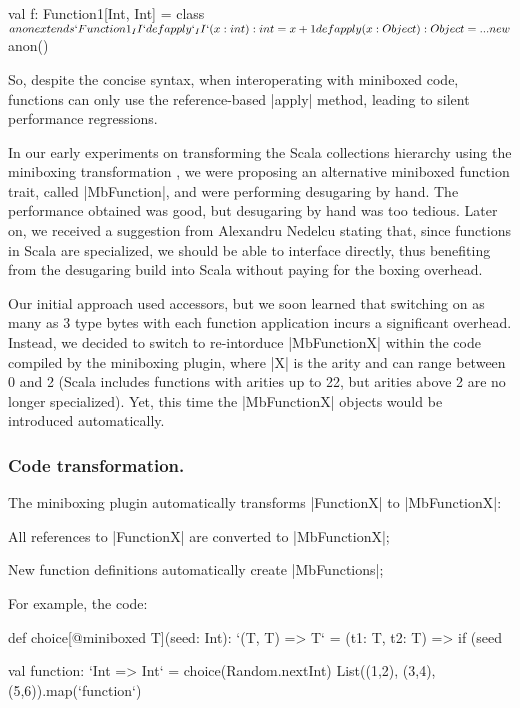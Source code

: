 \begin{lstlisting-nobreak}
 val f: Function1[Int, Int] = {
   class $anon extends `Function1_II` {
     def apply`_II`(x: int): int = x + 1
     def apply(x: Object): Object = ...
   }
   new $anon()
 }
\end{lstlisting-nobreak}

So, despite the concise syntax, when interoperating with miniboxed code, functions can only use the reference-based |apply| method, leading to silent performance regressions.

In our early experiments on transforming the Scala collections hierarchy using the miniboxing transformation \cite{miniboxing-linkedlist}, we were proposing an alternative miniboxed function trait, called |MbFunction|, and were performing desugaring by hand. The performance obtained was good, but desugaring by hand was too tedious. Later on, we received a suggestion from Alexandru Nedelcu stating that, since functions in Scala are specialized, we should be able to interface directly, thus benefiting from the desugaring build into Scala without paying for the boxing overhead.

Our initial approach used accessors, but we soon learned that switching on as many as 3 type bytes with each function application incurs a significant overhead. Instead, we decided to switch to re-intorduce |MbFunctionX| within the code compiled by the miniboxing plugin, where |X| is the arity and can range between 0 and 2 (Scala includes functions with arities up to 22, but arities above 2 are no longer specialized). Yet, this time the |MbFunctionX| objects would be introduced automatically.

\subsubsection{Code transformation.} The miniboxing plugin automatically transforms |FunctionX| to |MbFunctionX|:

\begin{compactitem}
  \item All references to |FunctionX| are converted to |MbFunctionX|;
  \item New function definitions automatically create |MbFunctions|;
\end{compactitem}

For example, the code:

\begin{lstlisting-nobreak}
 def choice[@miniboxed T](seed: Int): `(T, T) => T` =
   (t1: T, t2: T) => if (seed %

 val function: `Int => Int` = choice(Random.nextInt)
 List((1,2), (3,4), (5,6)).map(`function`)
\end{lstlisting-nobreak}

